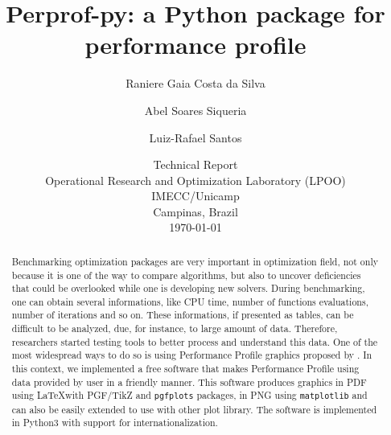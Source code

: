 \documentclass[10pt,a4paper]{article}
\begin{document}
\title{Perprof-py: a {P}ython package for performance profile}
\author{Raniere Gaia Costa da Silva \and Abel Soares Siqueria  \and Luiz-Rafael Santos}
\date{Technical Report \\ Operational Research and Optimization Laboratory (LPOO) \\ IMECC/Unicamp \\ Campinas, Brazil \\ \today}
\maketitle

\begin{abstract}
Benchmarking optimization packages are very important in optimization field,
not only because it is one of the way to compare algorithms, but also to uncover
deficiencies that could be overlooked while one is developing new solvers. During
benchmarking, one can obtain several informations, like CPU time, number of functions
evaluations, number of iterations and so on. These informations, if presented
as tables, can be difficult to be analyzed, due, for instance, to large amount of data.
Therefore, researchers started testing tools to better process and understand this
data. One of the most widespread ways to do so is using Performance Profile graphics
proposed by \textcite{Dolan:2002du}. In this context, we implemented a free software that makes Performance Profile using data provided by user in a friendly manner. This software produces graphics in PDF using \LaTeX with PGF/TikZ and \texttt{pgfplots} packages, in PNG using \texttt{matplotlib}
and can also be easily extended to use with other plot library. The software is
implemented in Python3 with support for internationalization. %
\end{abstract}

\printbibliography
\end{document}
